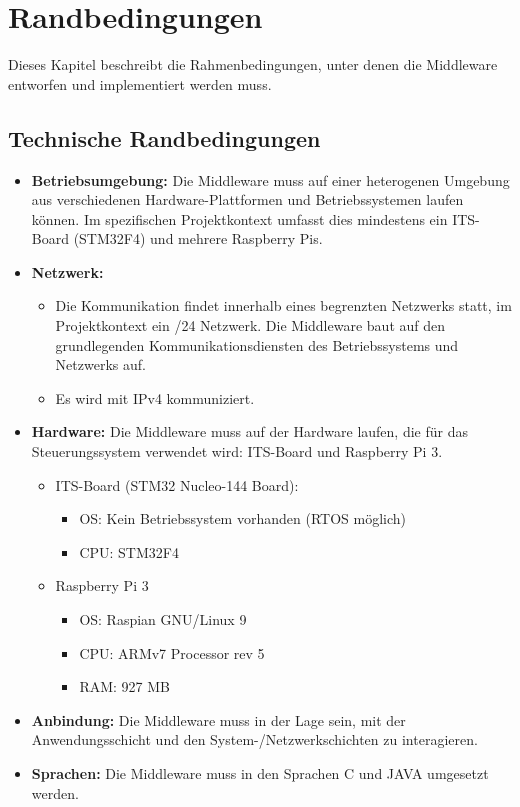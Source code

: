 

\chapter{Randbedingungen}

Dieses Kapitel beschreibt die Rahmenbedingungen, unter denen die Middleware entworfen und implementiert werden muss.

\section{Technische Randbedingungen}


\begin{itemize}
    \item \textbf{Betriebsumgebung:}  Die Middleware muss auf einer heterogenen Umgebung aus verschiedenen Hardware-Plattformen und Betriebssystemen laufen können. Im spezifischen Projektkontext umfasst dies mindestens ein ITS-Board (STM32F4) und mehrere Raspberry Pis.
    
    \item \textbf{Netzwerk:}  
    \begin{itemize}
        \item Die Kommunikation findet innerhalb eines begrenzten Netzwerks statt, im Projektkontext ein /24 Netzwerk. Die Middleware baut auf den grundlegenden Kommunikationsdiensten des Betriebssystems und Netzwerks auf.
        \item Es wird mit IPv4 kommuniziert.
    \end{itemize}
    \item \textbf{Hardware:} Die Middleware muss auf der Hardware laufen, die für das Steuerungssystem verwendet wird: ITS-Board und Raspberry Pi 3. 
    \begin{itemize}
    	\item ITS-Board (STM32 Nucleo-144 Board): 
    	\begin{itemize}
    		\item OS: Kein Betriebssystem vorhanden (RTOS möglich)
    		\item CPU: STM32F4
    		
    	\end{itemize}
    	\item Raspberry Pi 3
    	\begin{itemize}
    		\item OS: Raspian GNU/Linux 9
    		\item CPU: ARMv7 Processor rev 5
    		\item RAM: 927 MB
    		
    	\end{itemize}
    \end{itemize}
    \item \textbf{Anbindung:} Die Middleware muss in der Lage sein, mit der Anwendungsschicht und den System-/Netzwerkschichten zu interagieren.
    \item \textbf{Sprachen:} Die Middleware muss in den Sprachen C und JAVA umgesetzt werden. 

    
\end{itemize}

